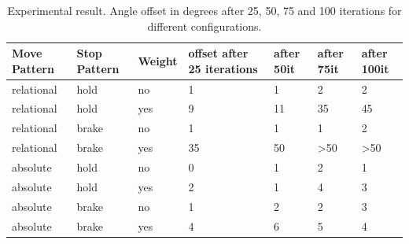 \documentclass[11pt, a4paper]{article}
\begin{document}
\begin{table}[H]
	\centering
	\begin{tabular}{|l|l|l|l|l|l|l|}
		\hline
		Move Pattern & Stop Pattern & Weight & offset after 25 iterations & after 50it & after 75it             & after 100it            \\ \hline \hline
		relational   & hold         & no     & 1             & 1    & 2                & 2                \\ \hline
		relational   & hold         & yes    & 9             & 11   & 35               & 45               \\ \hline
		relational   & brake        & no     & 1             & 1    & 1                & 2                \\ \hline
		relational   & brake        & yes    & 35            & 50   & \textgreater{}50 & \textgreater{}50 \\ \hline
		absolute     & hold         & no     & 0             & 1    & 2                & 1                \\ \hline
		absolute     & hold         & yes    & 2             & 1    & 4                & 3                \\ \hline
		absolute     & brake        & no     & 1             & 2    & 2                & 3                \\ \hline
		absolute     & brake        & yes    & 4             & 6    & 5                & 4                \\ \hline
	\end{tabular}
	\caption{Experimental result. Angle offset in degrees after 25, 50, 75 and 100 iterations for different configurations.}
	\label{tab:angle_experiment}
\end{table}
\end{document}
